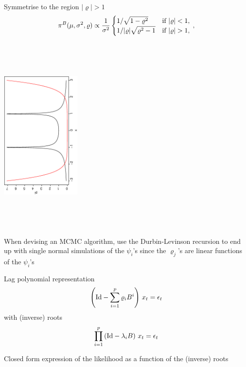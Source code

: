 \begin{slide}
{} Symmetrise to the region $|\varrho| > 1$
$$
\pi^B(\mu,\sigma^2,\varrho) \propto \frac{1}{\sigma^2} 
\begin{cases} 1/\sqrt{1-\varrho^2} & \hbox{if }|\varrho| < 1,\cr
        1/|\varrho| \sqrt{\varrho^2-1} & \hbox{if }|\varrho| > 1,\cr\end{cases} \,,
$$

\includegraphics[height=10cm,width=4cm,angle=270]{figures/statiozone.ps}

\end{slide}\begin{slide}

When devising an MCMC algorithm, use the Durbin-Levinson recursion to end up with
single normal simulations of the $\psi_i$'s since the $\varrho_j$'s are linear
functions of the $\psi_i$'s

\end{slide}\begin{slide}[label=Rootpara]

\hyperlink{DLrepa}{}Lag polynomial representation 
$$
\left(\hbox{Id} - \sum_{i=1}^p \varrho_i B^i\right)\,x_t = \epsilon_t
$$
with (inverse) roots
$$
\prod_{i=1}^p \left( \hbox{Id} - \lambda_i B\right) \,x_t = \epsilon_t
$$

\vs\pause
Closed form expression of the likelihood as a function of the (inverse) roots

\end{slide}\begin{slide}


\end{slide}
